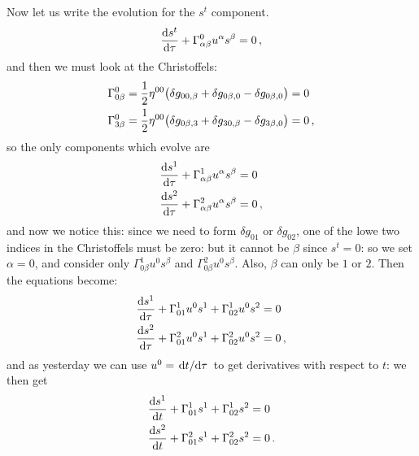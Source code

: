 \documentclass[main.tex]{subfiles}
\begin{document}
Now let us write the evolution for the \(s^{t}\) component. 
%
\begin{align}
  \dv{s^{t}}{\tau } + \Gamma^{0}_{\alpha \beta } u^{\alpha } s^{\beta } = 0
\,,
\end{align}
%
and then we must look at the Christoffels: 
%
\begin{subequations}
\begin{align}
\Gamma^{0}_{0 \beta } &= \frac{1}{2} \eta^{00} \qty(
    \delta g_{0 0, \beta } +
    \delta g_{0 \beta , 0} 
    - \delta g_{0 \beta ,0 } 
) =0 \\
\Gamma^{0}_{3 \beta } &= \frac{1}{2} \eta^{00} \qty(
    \delta g_{0 \beta , 3 } +
    \delta g_{3 0 , \beta } 
    - \delta g_{3 \beta ,0 } 
) =0
\,,
\end{align}
\end{subequations}
%
so the only components which evolve are 
%
\begin{subequations}
\begin{align}
  \dv{s^{1}}{\tau } + \Gamma^{1}_{\alpha \beta } u^{\alpha } s^{\beta } &= 0 \\
  \dv{s^{2}}{\tau } + \Gamma^{2}_{\alpha \beta } u^{\alpha } s^{\beta } &= 0
\,,
\end{align}
\end{subequations}
%
and now we notice this: since we need to form \(\delta g_{01}\) or \(\delta g_{02}\), one of the lowe two indices in the Christoffels must be zero: but it cannot be \(\beta \) since \(s^{t}=0\): so we set \(\alpha =0\), and consider only \(\Gamma^{1}_{0 \beta } u^{0} s^{\beta }\) and \(\Gamma^{2}_{0 \beta } u^{0} s^{\beta }\). Also, \(\beta \) can only be \(1\) or \(2\). Then the equations become: 
%
\begin{subequations}
\begin{align}
    \dv{s^{1}}{\tau } + \Gamma^{1}_{0 1 } u^{0 } s^{1 } + \Gamma^{1}_{0 2 } u^{0 } s^{2 } &= 0 \\
  \dv{s^{2}}{\tau } + \Gamma^{2}_{0 1} u^{0 } s^{1}  + \Gamma^{2}_{0 2} u^{0 } s^{2} &= 0
\,,
\end{align}
\end{subequations}
%
and as yesterday we can use \(u^{0} = \dv*{t}{\tau }\) to get derivatives with respect to \(t\): we then get 
%
\begin{subequations}
    \begin{align}
        \dv{s^{1}}{t } + \Gamma^{1}_{0 1 }  s^{1 } + \Gamma^{1}_{0 2 }  s^{2 } &= 0 \\
      \dv{s^{2}}{t } + \Gamma^{2}_{0 1}  s^{1}  + \Gamma^{2}_{0 2}  s^{2} &= 0
    \,.
    \end{align}
\end{subequations}
\end{document}
